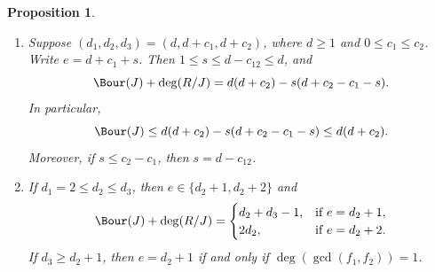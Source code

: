 \documentclass[11pt]{amsart} %
\newtheorem{Proposition}[Theorem]{Proposition}
\theoremstyle{definition}
\begin{document}
\begin{Proposition}
\begin{enumerate}
\item[\rm(v)] Suppose $(d_1,d_2,d_3)=(d,d+c_1,d+c_2)$, where $d\ge1$ and $0\le c_1\le c_2$. Write $e=d+c_1+s$. Then $1\le s\le d-c_{12}\le d$, and
\[
\Bour(J)+\deg(R/J)=d(d+c_2)-s(d+c_2-c_1-s).
\]
In particular,
\[
\Bour(J)\le d(d+c_2)-s(d+c_2-c_1-s)\le d(d+c_2).
\]
Moreover, if $s\le c_2-c_1$, then $s=d-c_{12}$.
\item[\rm(vi)] If $d_1=2\le d_2\le d_3$, then $e\in\{d_2+1,d_2+2\}$ and
\[
\Bour(J)+\deg(R/J)=
\begin{cases}
d_2+d_3-1, & \text{if } e=d_2+1,\\
2d_2, & \text{if } e=d_2+2.
\end{cases}
\]
If $d_3\ge d_2+1$, then $e=d_2+1$ if and only if $\deg(\gcd(f_1,f_2))=1$.
\end{enumerate}
\end{Proposition}
\end{document}
